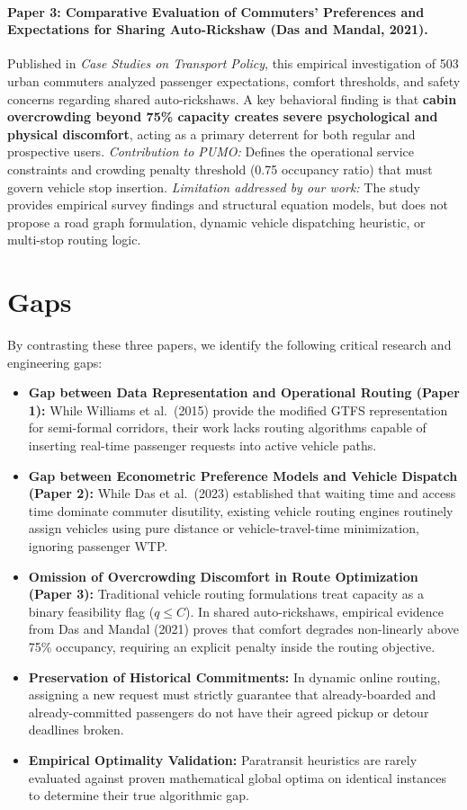\paragraph{Paper 3: Comparative Evaluation of Commuters' Preferences and Expectations for Sharing Auto-Rickshaw (Das and Mandal, 2021).}
Published in \emph{Case Studies on Transport Policy}, this empirical investigation of 503 urban commuters analyzed passenger expectations, comfort thresholds, and safety concerns regarding shared auto-rickshaws. A key behavioral finding is that \textbf{cabin overcrowding beyond 75\% capacity creates severe psychological and physical discomfort}, acting as a primary deterrent for both regular and prospective users.
\emph{Contribution to PUMO:} Defines the operational service constraints and crowding penalty threshold (0.75 occupancy ratio) that must govern vehicle stop insertion.
\emph{Limitation addressed by our work:} The study provides empirical survey findings and structural equation models, but does not propose a road graph formulation, dynamic vehicle dispatching heuristic, or multi-stop routing logic.

\section{Gaps}
By contrasting these three papers, we identify the following critical research and engineering gaps:
\begin{itemize}
\item \textbf{Gap between Data Representation and Operational Routing (Paper 1):} While Williams et al.\ (2015) provide the modified GTFS representation for semi-formal corridors, their work lacks routing algorithms capable of inserting real-time passenger requests into active vehicle paths.
\item \textbf{Gap between Econometric Preference Models and Vehicle Dispatch (Paper 2):} While Das et al.\ (2023) established that waiting time and access time dominate commuter disutility, existing vehicle routing engines routinely assign vehicles using pure distance or vehicle-travel-time minimization, ignoring passenger WTP.
\item \textbf{Omission of Overcrowding Discomfort in Route Optimization (Paper 3):} Traditional vehicle routing formulations treat capacity as a binary feasibility flag ($q \le C$). In shared auto-rickshaws, empirical evidence from Das and Mandal (2021) proves that comfort degrades non-linearly above 75\% occupancy, requiring an explicit penalty inside the routing objective.
\item \textbf{Preservation of Historical Commitments:} In dynamic online routing, assigning a new request must strictly guarantee that already-boarded and already-committed passengers do not have their agreed pickup or detour deadlines broken.
\item \textbf{Empirical Optimality Validation:} Paratransit heuristics are rarely evaluated against proven mathematical global optima on identical instances to determine their true algorithmic gap.
\end{itemize}

